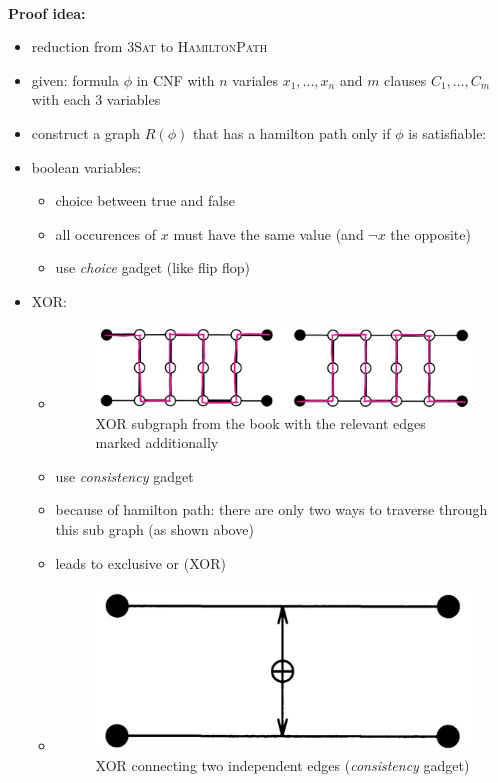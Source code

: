 \documentclass[a4]{scrartcl}
\begin{document}
\ \\
\textbf{Proof idea:}
\begin{itemize}
\item reduction from \textsc{3Sat} to \textsc{HamiltonPath}
\item given: formula $\phi$ in CNF with $n$ variales $x_1,...,x_n$ and $m$ clauses $C_1,...,C_m$ with each 3 variables
\item construct a graph $R(\phi)$ that has a hamilton path only if $\phi$ is satisfiable:

\item boolean variables:

\begin{itemize}
\item choice between true and false
\item all occurences of $x$ must have the same value (and $\neg x$ the opposite)
\item use \textit{choice} gadget (like flip flop)
\end{itemize}

\item XOR:

\begin{itemize}
\item[]
\begin{figure}[H]
\begin{center}
\includegraphics[scale=0.5]{xor.jpg}
\end{center}
\caption{XOR subgraph from the book \cite{book} with the relevant edges marked additionally}
\end{figure}
\item use \textit{consistency} gadget
\item because of hamilton path: there are only two ways to traverse through this sub graph (as shown above)
\item leads to exclusive or (XOR)
\item[]
\begin{figure}[H]
\begin{center}
\includegraphics[scale=0.2]{xor2.jpg}
\end{center}
\caption{XOR connecting two independent edges (\textit{consistency} gadget) \cite{book}}
\end{figure}
\end{itemize}


\end{itemize}
\end{document}
